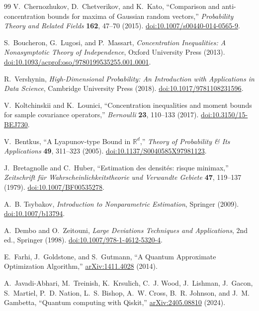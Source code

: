 \documentclass[a4paper,onecolumn,unpublished,nopdfoutputerror]{quantumarticle}
\theoremstyle{plain}
\theoremstyle{definition}
\newcommand{\1}{\mathbf{1}}
\begin{document}
\begin{thebibliography}{99}
V.~Chernozhukov, D.~Chetverikov, and K.~Kato,
``Comparison and anti-concentration bounds for maxima of Gaussian random vectors,''
\emph{Probability Theory and Related Fields} \textbf{162}, 47--70 (2015). \href{https://doi.org/10.1007/s00440-014-0565-9}{doi:10.1007/s00440-014-0565-9}.

S.~Boucheron, G.~Lugosi, and P.~Massart,
\emph{Concentration Inequalities: A Nonasymptotic Theory of Independence},
Oxford University Press (2013). \href{https://doi.org/10.1093/acprof:oso/9780199535255.001.0001}{doi:10.1093/acprof:oso/9780199535255.001.0001}.

R.~Vershynin,
\emph{High-Dimensional Probability: An Introduction with Applications in Data Science},
Cambridge University Press (2018). \href{https://doi.org/10.1017/9781108231596}{doi:10.1017/9781108231596}.

V.~Koltchinskii and K.~Lounici,
``Concentration inequalities and moment bounds for sample covariance operators,''
\emph{Bernoulli} \textbf{23}, 110--133 (2017). \href{https://doi.org/10.3150/15-BEJ730}{doi:10.3150/15-BEJ730}.


V.~Bentkus,
``A Lyapunov-type Bound in $\mathbb{R}^d$,''
\emph{Theory of Probability \& Its Applications} \textbf{49}, 311--323 (2005). \href{https://doi.org/10.1137/S0040585X97981123}{doi:10.1137/S0040585X97981123}.

J.~Bretagnolle and C.~Huber,
``Estimation des densit\'es: risque minimax,''
\emph{Zeitschrift f\"ur Wahrscheinlichkeitstheorie und Verwandte Gebiete} \textbf{47}, 119--137 (1979). \href{https://doi.org/10.1007/BF00535278}{doi:10.1007/BF00535278}.

A.~B. Tsybakov,
\emph{Introduction to Nonparametric Estimation},
Springer (2009). \href{https://doi.org/10.1007/b13794}{doi:10.1007/b13794}.

A.~Dembo and O.~Zeitouni,
\emph{Large Deviations Techniques and Applications},
2nd ed., Springer (1998). \href{https://doi.org/10.1007/978-1-4612-5320-4}{doi:10.1007/978-1-4612-5320-4}.

E.~Farhi, J.~Goldstone, and S.~Gutmann,
``A Quantum Approximate Optimization Algorithm,''
\href{https://arxiv.org/abs/1411.4028}{arXiv:1411.4028} (2014).

A.~Javadi-Abhari, M.~Treinish, K.~Krsulich, C.~J. Wood, J.~Lishman, J.~Gacon, S.~Martiel, P.~D. Nation, L.~S. Bishop, A.~W. Cross, B.~R. Johnson, and J.~M. Gambetta,
``Quantum computing with Qiskit,''
\href{https://arxiv.org/abs/2405.08810}{arXiv:2405.08810} (2024).


\end{thebibliography}
\end{document}
